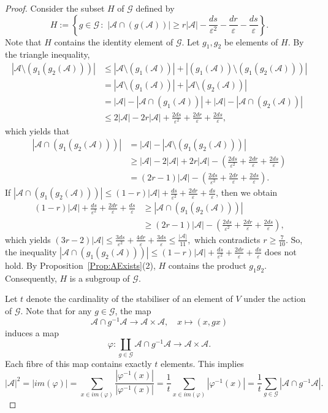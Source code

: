 \documentclass[10pt]{article}
\theoremstyle{definition}
\newcommand{\mo}{{-1}}
\newcommand{\calG}{\ensuremath{\mathcal{G}}}
\newcommand{\scrA}{\ensuremath{\mathscr{A}}}
\begin{document}
\begin{proof}
Consider the subset $H$ of $\calG$ defined by
$$H  :=
\left\{
g\in \calG \,:\,\, |\scrA \cap  (g(\scrA))| \geq r|\scrA| - \frac{ds}{\varepsilon^2} 
- \frac{dr}{\varepsilon}
- \frac{ds}{\varepsilon}
\right\}.$$
Note that $H$ contains the identity element of $\calG$. Let $g_1, g_2$ be elements of $H$. By the triangle inequality, 
\begin{align*}
|\scrA \setminus (g_1(g_2(\scrA)))| 
& \leq |\scrA \setminus (g_1(\scrA)) | + |(g_1(\scrA)) \setminus (g_1(g_2(\scrA)))| \\
& =  |\scrA \setminus  (g_1(\scrA)) | + |\scrA  \setminus (g_2(\scrA)) |\\
& = |\scrA | -  |\scrA \cap (g_1(\scrA))  | + |\scrA | - |\scrA  \cap (g_2(\scrA)) |\\
& \leq 2|\scrA| - 2r |\scrA| + \frac{2ds}{\varepsilon^2}  + \frac{2dr}{\varepsilon} 
+\frac{2ds}{\varepsilon} ,
\end{align*}
which yields that  
\begin{align*}
|\scrA \cap (g_1(g_2(\scrA)))| 
& = |\scrA | - |\scrA \setminus (g_1(g_2(\scrA)))| \\
& \geq |\scrA | - 2|\scrA| + 2r |\scrA| - \left(\frac{2ds}{\varepsilon^2} +\frac{2dr}{\varepsilon} + \frac{2ds}{\varepsilon} \right)\\
& = (2r - 1) |\scrA| - \left(\frac{2ds}{\varepsilon^2} + \frac{2dr}{\varepsilon} +\frac{2ds}{\varepsilon} \right).
\end{align*}
If $|\scrA \cap (g_1(g_2(\scrA)))| \leq (1-r) |\scrA| + \frac{ds}{\varepsilon^2} + \frac{2dr}\varepsilon +\frac{ds}{\varepsilon}$, then we obtain 
\begin{align*}
(1-r) |\scrA| + \frac{ds}{\varepsilon^2} + \frac{2dr}\varepsilon + \frac{ds}{\varepsilon}
&\geq |\scrA \cap (g_1(g_2(\scrA)))| \\
&\geq  (2r - 1) |\scrA| - \left(\frac{2ds}{\varepsilon^2} + \frac{2dr}{\varepsilon} + \frac{2ds}{\varepsilon} \right),
\end{align*}
which yields
$(3r-2)
|\scrA| 
\leq \frac{3ds}{\varepsilon^2} + \frac{4dr}{\varepsilon} + \frac{3ds}{\varepsilon} 
\leq \frac {|\scrA|}{ 11},
$
which contradicts $ r \geq \frac 7{10}$. 
So, the inequality 
$|\scrA \cap (g_1(g_2(\scrA)))| \leq (1-r) |\scrA|
+ \frac{ds}{\varepsilon^2} + \frac{2dr}\varepsilon + \frac{ds}{\varepsilon}$
does not hold. By Proposition~\ref{Prop:AExists}(2), $H$ contains the product $g_1g_2$. Consequently, $H$ is a subgroup of $\calG$. 

Let $t$ denote the cardinality of the stabiliser of an element of $V$ under the action of $\calG$. Note that for any $g\in \calG$, the map
$$\scrA\cap g^\mo \scrA \to \scrA\times \scrA, \quad 
x\mapsto (x, gx)$$ 
induces a map 
$$\varphi: \coprod _{g\in \calG} \scrA\cap g^\mo \scrA \to \scrA\times \scrA.$$
Each fibre of this map contains exactly $t$ elements. This implies 
$$
|\scrA|^2
= |im(\varphi)|
= \sum_{x\in im(\varphi) } \frac{|\varphi^\mo (x)|} {|\varphi^\mo (x)|}
= \frac 1t \sum_{x\in im(\varphi)} |\varphi^\mo (x)|
= \frac 1t \sum_{g\in \calG} |\scrA\cap g^\mo \scrA|.$$


\end{proof}
\end{document}
